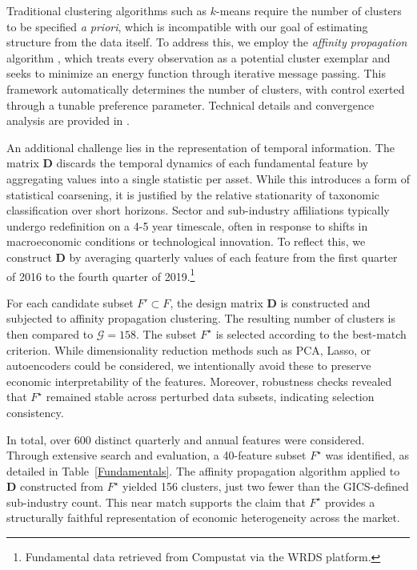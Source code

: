 \documentclass[pdflatex,sn-mathphys-num]{sn-jnl}%
\theoremstyle{thmstyleone}%
\theoremstyle{thmstyletwo}%
\theoremstyle{thmstylethree}%
\begin{document}
Traditional clustering algorithms such as $k$-means require the number of clusters to be specified \textit{a priori}, which is incompatible with our goal of estimating structure from the data itself. To address this, we employ the \textit{affinity propagation} algorithm \citep{frey2007clustering}, which treats every observation as a potential cluster exemplar and seeks to minimize an energy function through iterative message passing. This framework automatically determines the number of clusters, with control exerted through a tunable preference parameter. Technical details and convergence analysis are provided in \citep{dueck2009affinity}.

An additional challenge lies in the representation of temporal information. The matrix $\mathbf{D}$ discards the temporal dynamics of each fundamental feature by aggregating values into a single statistic per asset. While this introduces a form of statistical coarsening, it is justified by the relative stationarity of taxonomic classification over short horizons. Sector and sub-industry affiliations typically undergo redefinition on a 4-5 year timescale, often in response to shifts in macroeconomic conditions or technological innovation. To reflect this, we construct $\mathbf{D}$ by averaging quarterly values of each feature from the first quarter of 2016 to the fourth quarter of 2019.\footnote{Fundamental data retrieved from Compustat via the WRDS platform.}

For each candidate subset $\mathit{F}' \subset \mathit{F}$, the design matrix $\mathbf{D}$ is constructed and subjected to affinity propagation clustering. The resulting number of clusters is then compared to $\mathcal{G} = 158$. The subset $\mathit{F}^\star$ is selected according to the best-match criterion. While dimensionality reduction methods such as PCA, Lasso, or autoencoders could be considered, we intentionally avoid these to preserve economic interpretability of the features. Moreover, robustness checks revealed that $\mathit{F}^\star$ remained stable across perturbed data subsets, indicating selection consistency.

In total, over 600 distinct quarterly and annual features were considered. Through extensive search and evaluation, a 40-feature subset $\mathit{F}^\star$ was identified, as detailed in Table~\ref{Fundamentals}. The affinity propagation algorithm applied to $\mathbf{D}$ constructed from $\mathit{F}^\star$ yielded 156 clusters, just two fewer than the GICS-defined sub-industry count. This near match supports the claim that $\mathit{F}^\star$ provides a structurally faithful representation of economic heterogeneity across the market.
\end{document}
